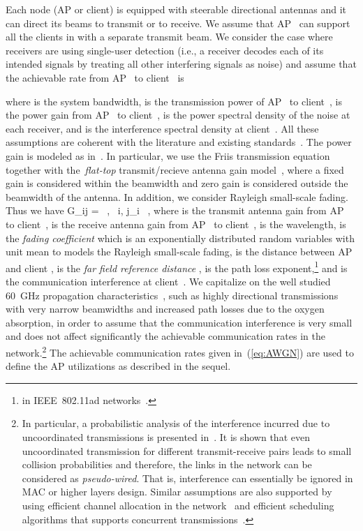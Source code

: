 \documentclass[journal, 10pt, twocolumn]{IEEEtran}
\newcommand{\be}{}
\begin{document}
Each node (AP or client) is equipped with steerable directional antennas and it can direct its beams to transmit or to receive. We assume that AP~ can support all the clients in  with a separate transmit beam. We consider the case where receivers are using single-user detection (i.e., a receiver decodes each of its intended signals by treating all other interfering signals as noise) and assume that the achievable rate from AP~ to client~ is

where  is the system bandwidth,  is the transmission power of AP~ to client~,  is the power gain from AP~ to client~,  is the power spectral density of the noise at each receiver, and  is the interference spectral density at client~. All these assumptions are coherent with the literature and existing standards~\cite{802_11ad, 802_15_3c}. The power gain  is modeled as in~\cite{Qiao11}. In particular, we use the Friis transmission equation together with the~\emph{flat-top} transmit/recieve antenna gain model~\cite{Mudumbai09}, where a fixed gain is considered within the beamwidth and zero gain is considered outside the beamwidth of the antenna. In addition, we consider Rayleigh small-scale fading. Thus we have
\be\label{eq:gain_coefficient}
G_{ij} =  \ , \ i\in{}, j\in{}_i \ ,
\ee
where  is the transmit antenna gain from AP~ to client~,  is the receive antenna gain from AP~ to client~,  is the wavelength,  is the \emph{fading coefficient} which is an exponentially distributed random variables with unit mean to models the Rayleigh small-scale fading,  is the distance between AP  and client ,  is the \emph{far field reference distance} \cite{Anurag-Manjunath-Kuri-08},  is the path loss exponent,\footnote{ in IEEE~802.11ad networks~\cite{Geng09}.} and  is the communication interference at client~.
We capitalize on the well studied 60~GHz propagation characteristics~\cite{Mudumbai09}, such as highly directional transmissions with very narrow beamwidths and increased path losses due to the oxygen absorption, in order to assume that the communication interference  is very small and does not affect significantly the achievable communication rates in the network.\footnote{In particular, a probabilistic analysis of the interference incurred due to uncoordinated transmissions is presented in~\cite{Mudumbai09}. It is shown that even uncoordinated transmission for different transmit-receive pairs leads to small collision probabilities and therefore, the links in the network can be considered as \emph{pseudo-wired}. That is, interference can essentially be ignored in MAC or higher layers design. Similar assumptions are also supported by using efficient channel allocation in the network~\cite{Athanasiou08} and efficient scheduling algorithms that supports concurrent transmissions~\cite{Qiao11}.} The achievable communication rates given in~(\ref{eq:AWGN}) are used to define the AP utilizations as described in the sequel.
\end{document}
